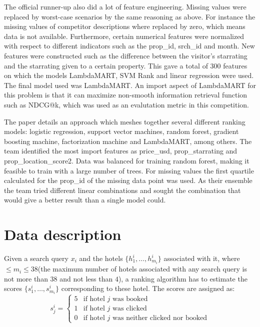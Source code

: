 \documentclass{llncs}
\begin{document}
The official runner-up also did a lot of feature engineering. Missing values were replaced by worst-case scenarios by the same reasoning as above. For instance the missing values of competitor descriptions where replaced by zero, which means data is not available. Furthermore, certain numerical features were normalized with respect to different indicators such as the prop\_id, srch\_id and month. New features were constructed such as the difference between the visitor's starrating and the starrating given to a certain property. This gave a total of 300 features on which the models LambdaMART, SVM Rank and linear regression were used. The final model used was LambdaMART. An import aspect of LambdaMART for this problem is that it can maximize non-smooth information retrieval function such as NDCG@k, which was used as an evalutation metric in this competition.

The paper \cite{DBLP:journals/corr/LiuXZYPLSW13} details an approach which meshes together several different ranking models: logistic regression, support vector machines, random forest, gradient boosting machine, factorization machine and LambdaMART, among others. The team identified the most import features as price\_usd, prop\_starrating and prop\_location\_score2. Data was balanced for training random forest, making it feasible to train with a large number of trees.  For missing values the first quartile calculated for the prop\_id of the missing data point was used. As their ensemble the team tried different linear combinations and sought the combination that would give a better result than a single model could.
 
\section{Data description}
Given a search query $x_{i}$ and the hotels $\{h_{1}^{i},\dots,h_{m_{i}}^{i}\}$ associated with it, where $\leq m_{i} \leq 38$(the maximum number of hotels associated with any search query is not more than $38$ and not less than $4$), a ranking algorithm has to estimate the scores  $\{s_{1}^{i},\dots,s_{m_{i}}^{i}\}$ corresponding to these hotel. The scores are assigned as:
$$
s_{j}^{i}=
\left\{
	\begin{array}{ll}
		5  & \mbox{if hotel $j$ was booked }   \\
		1 & \mbox{if hotel $j$ was clicked }  \\
		0 & \mbox{if hotel $j$ was neither clicked nor booked}
	\end{array}
\right.
$$
  
\end{document}
